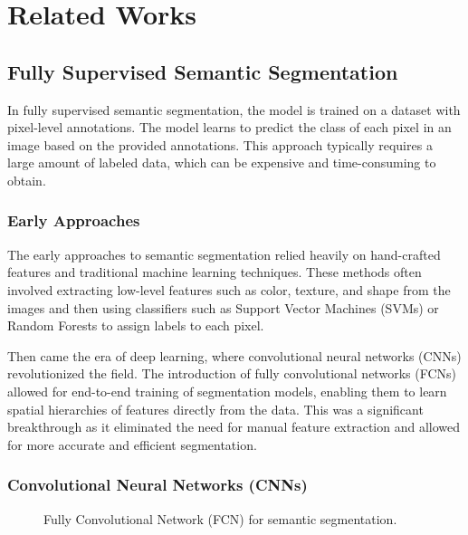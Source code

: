 \chapter {Related Works}
\label{chap:related-works}

\section{Fully Supervised Semantic Segmentation}
\label{sec:fully-supervised}

In fully supervised semantic segmentation, the model is trained on a dataset with pixel-level annotations. The model learns to predict the class of each pixel in an image based on the provided annotations. This approach typically requires a large amount of labeled data, which can be expensive and time-consuming to obtain.

\subsection{Early Approaches}
\label{subsec:early-approaches}
The early approaches to semantic segmentation relied heavily on hand-crafted features and traditional machine learning techniques. These methods often involved extracting low-level features such as color, texture, and shape from the images and then using classifiers such as Support Vector Machines (SVMs) or Random Forests to assign labels to each pixel.

Then came the era of deep learning, where convolutional neural networks (CNNs) revolutionized the field. The introduction of fully convolutional networks (FCNs) allowed for end-to-end training of segmentation models, enabling them to learn spatial hierarchies of features directly from the data. This was a significant breakthrough as it eliminated the need for manual feature extraction and allowed for more accurate and efficient segmentation.

\subsection{Convolutional Neural Networks (CNNs)}
\label{subsec:cnn_sem_seg}

\begin{figure}[htbp]
    \centering
    \caption{Fully Convolutional Network (FCN) for semantic segmentation.}
    \label{fig:fcn}
\end{figure}

